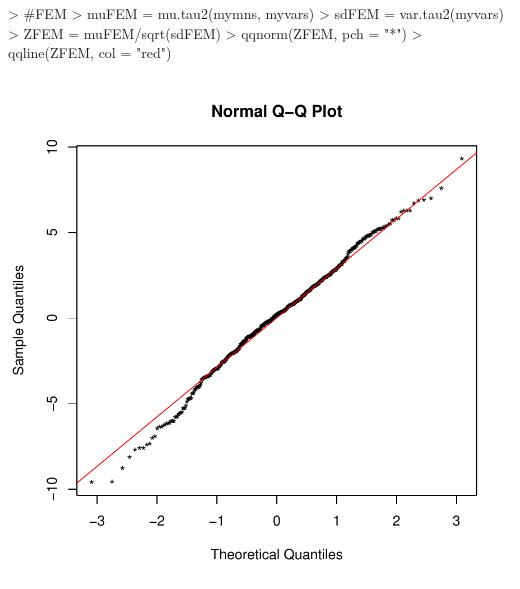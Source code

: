 \documentclass[a4paper]{report}
\begin{document}
\begin{center}
\begin{Schunk}
\begin{Sinput}
> #FEM
> muFEM = mu.tau2(mymns, myvars)
> sdFEM = var.tau2(myvars)
> ZFEM = muFEM/sqrt(sdFEM)
> qqnorm(ZFEM, pch = "*")
> qqline(ZFEM, col = "red")
\end{Sinput}
\end{Schunk}
\includegraphics{MAMA_full-016}
\end{center}
\end{document}
